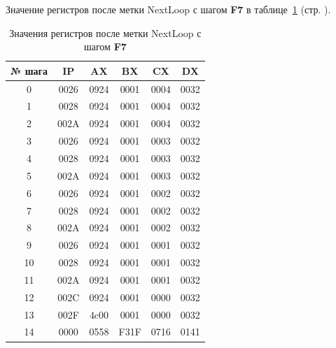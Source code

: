 Значение регистров после метки NextLoop с шагом \textbf{F7} в таблице~\ref{tab:task_4_9__table} (стр. \pageref{tab:task_4_9__table}).

\begin{table}[!htp]
    \centering
    \caption{Значения регистров после метки NextLoop с шагом \textbf{F7}}
    \label{tab:task_4_9__table}
    \begin{tabular}{|c|c|c|c|c|c|} 
        \hline
        № шага  & IP    & AX    & BX    & CX    & DX    \\ \hline
        \hline
        0       & 0026  & 0924  & 0001  & 0004  & 0032  \\ \hline
        1       & 0028  & 0924  & 0001  & 0004  & 0032  \\ \hline
        2       & 002A  & 0924  & 0001  & 0004  & 0032  \\ \hline
        3       & 0026  & 0924  & 0001  & 0003  & 0032  \\ \hline
        4       & 0028  & 0924  & 0001  & 0003  & 0032  \\ \hline
        5       & 002A  & 0924  & 0001  & 0003  & 0032  \\ \hline
        6       & 0026  & 0924  & 0001  & 0002  & 0032  \\ \hline
        7       & 0028  & 0924  & 0001  & 0002  & 0032  \\ \hline
        8       & 002A  & 0924  & 0001  & 0002  & 0032  \\ \hline
        9       & 0026  & 0924  & 0001  & 0001  & 0032  \\ \hline
        10      & 0028  & 0924  & 0001  & 0001  & 0032  \\ \hline
        11      & 002A  & 0924  & 0001  & 0001  & 0032  \\ \hline
        12      & 002C  & 0924  & 0001  & 0000  & 0032  \\ \hline
        13      & 002F  & 4c00  & 0001  & 0000  & 0032  \\ \hline
        14      & 0000  & 0558  & F31F  & 0716  & 0141  \\ \hline
    \end{tabular}
\end{table}

\newpage
